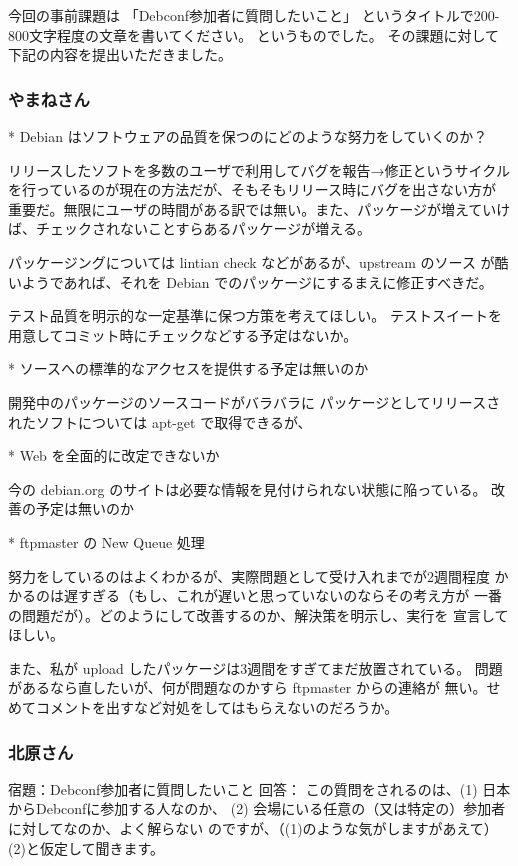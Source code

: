 \documentclass[mingoth,a4paper]{jsarticle}
\begin{document}
今回の事前課題は
「Debconf参加者に質問したいこと」
というタイトルで200-800文字程度の文章を書いてください。
というものでした。
その課題に対して下記の内容を提出いただきました。

\subsubsection{やまねさん}


* Debian はソフトウェアの品質を保つのにどのような努力をしていくのか？

リリースしたソフトを多数のユーザで利用してバグを報告→修正というサイクル
を行っているのが現在の方法だが、そもそもリリース時にバグを出さない方が
重要だ。無限にユーザの時間がある訳では無い。また、パッケージが増えていけ
ば、チェックされないことすらあるパッケージが増える。

パッケージングについては lintian check などがあるが、upstream のソース
が酷いようであれば、それを Debian でのパッケージにするまえに修正すべきだ。

テスト品質を明示的な一定基準に保つ方策を考えてほしい。
テストスイートを用意してコミット時にチェックなどする予定はないか。



* ソースへの標準的なアクセスを提供する予定は無いのか

開発中のパッケージのソースコードがバラバラに
パッケージとしてリリースされたソフトについては apt-get で取得できるが、


* Web を全面的に改定できないか

今の debian.org のサイトは必要な情報を見付けられない状態に陥っている。
改善の予定は無いのか


* ftpmaster の New Queue 処理

努力をしているのはよくわかるが、実際問題として受け入れまでが2週間程度
かかるのは遅すぎる（もし、これが遅いと思っていないのならその考え方が
一番の問題だが）。どのようにして改善するのか、解決策を明示し、実行を
宣言してほしい。

また、私が upload したパッケージは3週間をすぎてまだ放置されている。
問題があるなら直したいが、何が問題なのかすら ftpmaster からの連絡が
無い。せめてコメントを出すなど対処をしてはもらえないのだろうか。



\subsubsection{北原さん}


宿題：Debconf参加者に質問したいこと
回答：
この質問をされるのは、(1) 日本からDebconfに参加する人なのか、
(2) 会場にいる任意の（又は特定の）参加者に対してなのか、よく解らない
のですが、（(1)のような気がしますがあえて）(2)と仮定して聞きます。
\end{document}
